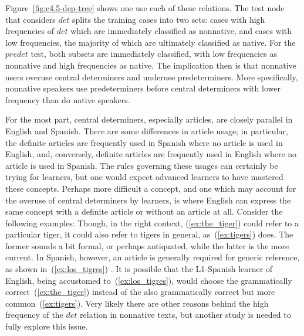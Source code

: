 \documentclass[main.tex]{subfiles}
\begin{document}
Figure~\ref{fig:c4.5-dep-tree} shows one use each of these relations. The test node that considers $det$ splits the training cases into two sets: cases with high frequencies of $det$ which are immediately classified as nonnative, and cases with low frequencies, the majority of which are ultimately classified as native. For the $predet$ test, both subsets are immediately classified, with low frequencies as nonnative and high frequencies as native. The implication then is that nonnative users overuse central determiners and underuse predeterminers. More specifically, nonnative speakers use predeterminers before central determiners with lower frequency than do native speakers.

For the most part, central determiners, especially articles, are closely parallel in English and Spanish. There are some differences in article usage; in particular, the definite articles are frequently used in Spanish where no article is used in English, and, conversely, definite articles are frequently used in English where no article is used in Spanish. The rules governing these usages can certainly be trying for learners, but one would expect advanced learners to have mastered these concepts. Perhaps more difficult a concept, and one which may account for the overuse of central determiners by learners, is where English can express the same concept with a definite article or without an article at all. Consider the following examples:
Though, in the right context, (\ref{ex:the_tiger}) could refer to a particular tiger, it could also refer to tigers in general, as~(\ref{ex:tigers}) does. The former sounds a bit formal, or perhaps antiquated, while the latter is the more current. In Spanish, however, an article is generally required for generic reference, as shown in~(\ref{ex:los_tigres}) \citep[p. 157]{whitley:1986}. It is possible that the L1-Spanish learner of English, being accustomed to~(\ref{ex:los_tigres}), would choose the grammatically correct~(\ref{ex:the_tiger}) instead of the also grammatically correct but more common~(\ref{ex:tigers}). Very likely there are other reasons behind the high frequency of the $det$ relation in nonnative texts, but another study is needed to fully explore this issue.
\end{document}
